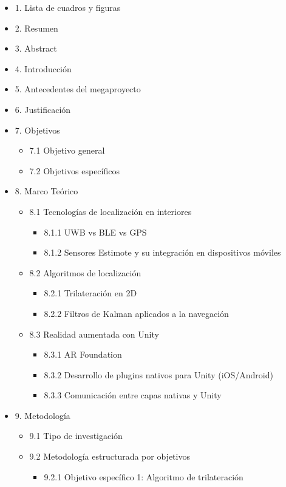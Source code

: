 \documentclass{article}
\begin{document}
\begin{itemize}
  \item 1. Lista de cuadros y figuras
  \item 2. Resumen
  \item 3. Abstract
  \item 4. Introducción
  \item 5. Antecedentes del megaproyecto
  \item 6. Justificación
  \item 7. Objetivos
  \begin{itemize}
    \item 7.1 Objetivo general
    \item 7.2 Objetivos específicos
  \end{itemize}
  \item 8. Marco Teórico
  \begin{itemize}
    \item 8.1 Tecnologías de localización en interiores
    \begin{itemize}
      \item 8.1.1 UWB vs BLE vs GPS
      \item 8.1.2 Sensores Estimote y su integración en dispositivos móviles
    \end{itemize}
    \item 8.2 Algoritmos de localización
    \begin{itemize}
      \item 8.2.1 Trilateración en 2D
      \item 8.2.2 Filtros de Kalman aplicados a la navegación
    \end{itemize}
    \item 8.3 Realidad aumentada con Unity
    \begin{itemize}
      \item 8.3.1 AR Foundation
      \item 8.3.2 Desarrollo de plugins nativos para Unity (iOS/Android)
      \item 8.3.3 Comunicación entre capas nativas y Unity
    \end{itemize}
  \end{itemize}
  \item 9. Metodología
  \begin{itemize}
    \item 9.1 Tipo de investigación
    \item 9.2 Metodología estructurada por objetivos
    \begin{itemize}
      \item 9.2.1 Objetivo específico 1: Algoritmo de trilateración

\end{itemize}
\end{itemize}
\end{itemize}
\end{document}
